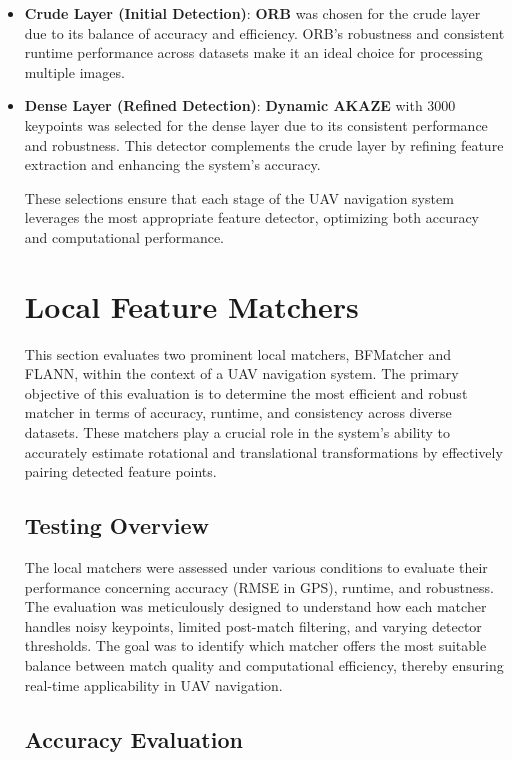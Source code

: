 \begin{itemize}
    \item \textbf{Crude Layer (Initial Detection)}: \textbf{ORB} was chosen for the crude layer due to its balance of accuracy and efficiency. ORB's robustness and consistent runtime performance across datasets make it an ideal choice for processing multiple images.
    
    \item \textbf{Dense Layer (Refined Detection)}: \textbf{Dynamic AKAZE} with 3000 keypoints was selected for the dense layer due to its consistent performance and robustness. This detector complements the crude layer by refining feature extraction and enhancing the system's accuracy.

These selections ensure that each stage of the UAV navigation system leverages the most appropriate feature detector, optimizing both accuracy and computational performance.



\section{Local Feature Matchers}

This section evaluates two prominent local matchers, BFMatcher and FLANN, within the context of a UAV navigation system. The primary objective of this evaluation is to determine the most efficient and robust matcher in terms of accuracy, runtime, and consistency across diverse datasets. These matchers play a crucial role in the system's ability to accurately estimate rotational and translational transformations by effectively pairing detected feature points.

\subsection{Testing Overview}

The local matchers were assessed under various conditions to evaluate their performance concerning accuracy (RMSE in GPS), runtime, and robustness. The evaluation was meticulously designed to understand how each matcher handles noisy keypoints, limited post-match filtering, and varying detector thresholds. The goal was to identify which matcher offers the most suitable balance between match quality and computational efficiency, thereby ensuring real-time applicability in UAV navigation.

\subsection{Accuracy Evaluation}


\end{itemize}
